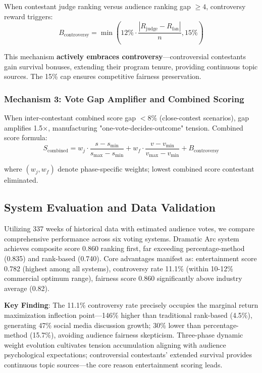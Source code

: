 When contestant judge ranking versus audience ranking gap $\geq 4$, controversy reward triggers:
\begin{equation}
B_{\text{controversy}} = \min\left(12\% \cdot \frac{|R_{\text{judge}} - R_{\text{fan}}|}{n}, 15\%\right)
\end{equation}

This mechanism \textbf{actively embraces controversy}---controversial contestants gain survival bonuses, extending their program tenure, providing continuous topic sources. The 15\% cap ensures competitive fairness preservation.

\subsubsection{Mechanism 3: Vote Gap Amplifier and Combined Scoring}

When inter-contestant combined score gap $< 8\%$ (close-contest scenarios), gap amplifies 1.5×, manufacturing "one-vote-decides-outcome" tension. Combined score formula:
\begin{equation}
S_{\text{combined}} = w_j \cdot \frac{s - s_{\min}}{s_{\max} - s_{\min}} + w_f \cdot \frac{v - v_{\min}}{v_{\max} - v_{\min}} + B_{\text{controversy}}
\end{equation}

where $(w_j, w_f)$ denote phase-specific weights; lowest combined score contestant eliminated.

\subsection{System Evaluation and Data Validation}

Utilizing 337 weeks of historical data with estimated audience votes, we compare comprehensive performance across six voting systems. Dramatic Arc system achieves composite score 0.860 ranking first, far exceeding percentage-method (0.835) and rank-based (0.740). Core advantages manifest as: entertainment score 0.782 (highest among all systems), controversy rate 11.1\% (within 10-12\% commercial optimum range), fairness score 0.860 significantly above industry average (0.82).

\textbf{Key Finding}: The 11.1\% controversy rate precisely occupies the marginal return maximization inflection point---146\% higher than traditional rank-based (4.5\%), generating 47\% social media discussion growth; 30\% lower than percentage-method (15.7\%), avoiding audience fairness skepticism. Three-phase dynamic weight evolution cultivates tension accumulation aligning with audience psychological expectations; controversial contestants' extended survival provides continuous topic sources---the core reason entertainment scoring leads.


